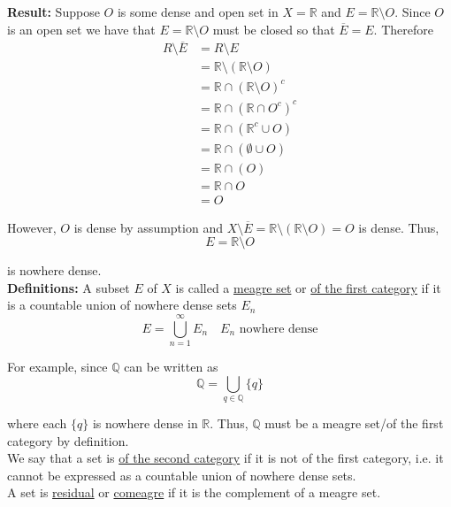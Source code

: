 \documentclass[12pt]{article}
\newlength\tindent
\renewcommand{\indent}{\hspace*{\tindent}}
\newcommand{\R}{\mathbb R}
\newcommand{\Q}{\mathbb Q}
\begin{document}
%
%
{\bf Result:} Suppose $O$ is some dense and open set in $X = \R$ and $E = \R\setminus O$. Since $O$ is an open set we have that $E = \R\setminus O$ must be closed so that $\overline{E} = E$. Therefore
\begin{align*}
	R\setminus\overline{E} &= R\setminus E \\
	&= \R\setminus \left( \R \setminus O \right) \\
	&= \R \cap \left( \R \setminus O \right)^c \\
	&= \R \cap \left( \R \cap O^c \right)^c \\
	&= \R \cap \left( \R^c \cup O \right) \\
	&= \R \cap \left( \emptyset \cup O \right) \\
	&= \R \cap \left( O \right) \\
	&= \R \cap O \\
	&= O
\end{align*}

However, $O$ is dense by assumption and $X\setminus\overline{E} = \R\setminus \left(\R\setminus O\right) = O$ is dense. Thus,
\begin{equation*}
	E = \R\setminus O
\end{equation*}

is nowhere dense. \\

%
% 
{\bf Definitions:} A subset $E$ of $X$ is called a \underline{meagre set} or \underline{of the first category} if it is a countable union of nowhere dense sets $E_n$
\begin{equation*}
	E = \bigcup^\infty_{n = 1} E_n \quad \text{$E_n$ nowhere dense}
\end{equation*}

For example, since $\Q$ can be written as
\begin{equation*}
	\Q = \bigcup_{q\in\Q} \{q\} 
\end{equation*}

where each $\{q\}$ is nowhere dense in $\R$. Thus, $\Q$ must be a meagre set/of the first category by definition. \\

\indent We say that a set is \underline{of the second category} if it is not of the first category, i.e. it cannot be expressed as a countable union of nowhere dense sets. \\

A set is \underline{residual} or \underline{comeagre} if it is the complement of a meagre set.
\end{document}
